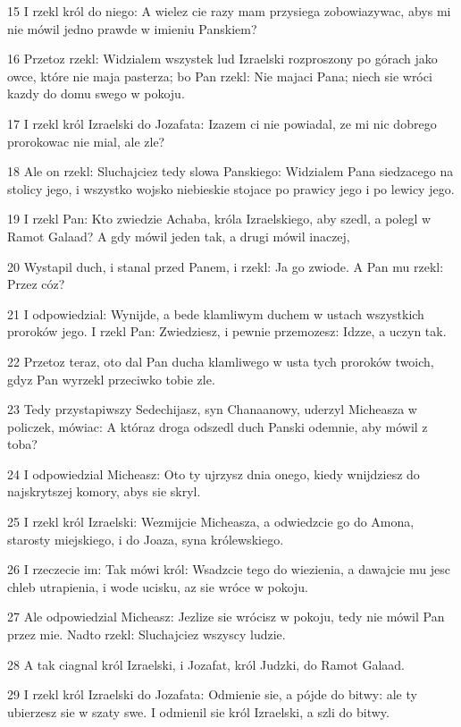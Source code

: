 \par 15 I rzekl król do niego: A wielez cie razy mam przysiega zobowiazywac, abys mi nie mówil jedno prawde w imieniu Panskiem?
\par 16 Przetoz rzekl: Widzialem wszystek lud Izraelski rozproszony po górach jako owce, które nie maja pasterza; bo Pan rzekl: Nie majaci Pana; niech sie wróci kazdy do domu swego w pokoju.
\par 17 I rzekl król Izraelski do Jozafata: Izazem ci nie powiadal, ze mi nic dobrego prorokowac nie mial, ale zle?
\par 18 Ale on rzekl: Sluchajciez tedy slowa Panskiego: Widzialem Pana siedzacego na stolicy jego, i wszystko wojsko niebieskie stojace po prawicy jego i po lewicy jego.
\par 19 I rzekl Pan: Kto zwiedzie Achaba, króla Izraelskiego, aby szedl, a polegl w Ramot Galaad? A gdy mówil jeden tak, a drugi mówil inaczej,
\par 20 Wystapil duch, i stanal przed Panem, i rzekl: Ja go zwiode. A Pan mu rzekl: Przez cóz?
\par 21 I odpowiedzial: Wynijde, a bede klamliwym duchem w ustach wszystkich proroków jego. I rzekl Pan: Zwiedziesz, i pewnie przemozesz: Idzze, a uczyn tak.
\par 22 Przetoz teraz, oto dal Pan ducha klamliwego w usta tych proroków twoich, gdyz Pan wyrzekl przeciwko tobie zle.
\par 23 Tedy przystapiwszy Sedechijasz, syn Chanaanowy, uderzyl Micheasza w policzek, mówiac: A któraz droga odszedl duch Panski odemnie, aby mówil z toba?
\par 24 I odpowiedzial Micheasz: Oto ty ujrzysz dnia onego, kiedy wnijdziesz do najskrytszej komory, abys sie skryl.
\par 25 I rzekl król Izraelski: Wezmijcie Micheasza, a odwiedzcie go do Amona, starosty miejskiego, i do Joaza, syna królewskiego.
\par 26 I rzeczecie im: Tak mówi król: Wsadzcie tego do wiezienia, a dawajcie mu jesc chleb utrapienia, i wode ucisku, az sie wróce w pokoju.
\par 27 Ale odpowiedzial Micheasz: Jezlize sie wrócisz w pokoju, tedy nie mówil Pan przez mie. Nadto rzekl: Sluchajciez wszyscy ludzie.
\par 28 A tak ciagnal król Izraelski, i Jozafat, król Judzki, do Ramot Galaad.
\par 29 I rzekl król Izraelski do Jozafata: Odmienie sie, a pójde do bitwy: ale ty ubierzesz sie w szaty swe. I odmienil sie król Izraelski, a szli do bitwy.
